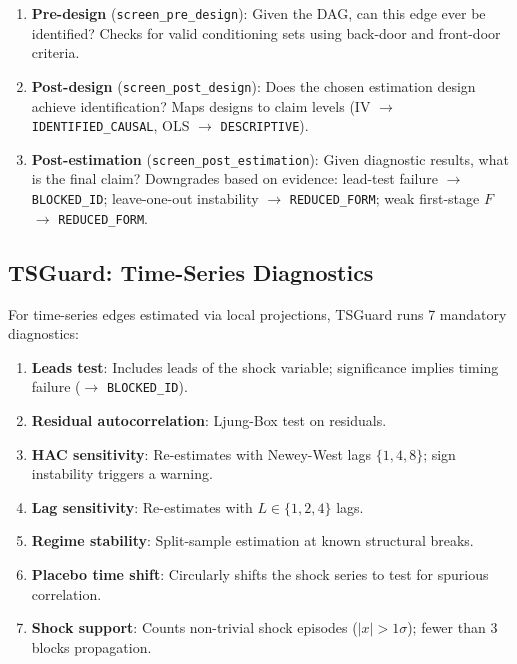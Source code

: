 \documentclass{article}
\begin{document}
\begin{enumerate}[leftmargin=*]
    \item \textbf{Pre-design} (\texttt{screen\_pre\_design}): Given the DAG, can this edge ever be identified? Checks for valid conditioning sets using back-door and front-door criteria.

    \item \textbf{Post-design} (\texttt{screen\_post\_design}): Does the chosen estimation design achieve identification? Maps designs to claim levels (\eg IV $\to$ \texttt{IDENTIFIED\_CAUSAL}, OLS $\to$ \texttt{DESCRIPTIVE}).

    \item \textbf{Post-estimation} (\texttt{screen\_post\_estimation}): Given diagnostic results, what is the final claim? Downgrades based on evidence: lead-test failure $\to$ \texttt{BLOCKED\_ID}; leave-one-out instability $\to$ \texttt{REDUCED\_FORM}; weak first-stage $F$ $\to$ \texttt{REDUCED\_FORM}.
\end{enumerate}

\subsection{TSGuard: Time-Series Diagnostics}
\label{sec:tsguard}

For time-series edges estimated via local projections, TSGuard runs 7 mandatory diagnostics:

\begin{enumerate}[leftmargin=*, itemsep=1pt]
    \item \textbf{Leads test}: Includes leads of the shock variable; significance implies timing failure ($\to$ \texttt{BLOCKED\_ID}).
    \item \textbf{Residual autocorrelation}: Ljung-Box test on residuals.
    \item \textbf{HAC sensitivity}: Re-estimates with Newey-West lags $\{1,4,8\}$; sign instability triggers a warning.
    \item \textbf{Lag sensitivity}: Re-estimates with $L \in \{1,2,4\}$ lags.
    \item \textbf{Regime stability}: Split-sample estimation at known structural breaks.
    \item \textbf{Placebo time shift}: Circularly shifts the shock series to test for spurious correlation.
    \item \textbf{Shock support}: Counts non-trivial shock episodes ($|x| > 1\sigma$); fewer than 3 blocks propagation.
\end{enumerate}
\end{document}
